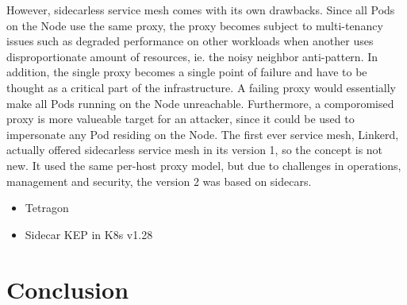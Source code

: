 \documentclass[english, 12pt, a4paper, sci, utf8, a-2b, online]{aaltothesis}
\begin{document}

However, sidecarless service mesh comes with its own drawbacks.
Since all Pods on the Node use the same proxy, the proxy becomes subject to multi-tenancy issues such as degraded performance on other workloads when another uses disproportionate amount of resources, ie. the noisy neighbor anti-pattern.
In addition, the single proxy becomes a single point of failure and have to be thought as a critical part of the infrastructure.
A failing proxy would essentially make all Pods running on the Node unreachable.
Furthermore, a comporomised proxy is more valueable target for an attacker, since it could be used to impersonate any Pod residing on the Node.
The first ever service mesh, Linkerd, actually offered sidecarless service mesh in its version 1, so the concept is not new.
It used the same per-host proxy model, but due to challenges in operations, management and security, the version 2 was based on sidecars.

\begin{itemize}
  \item Tetragon %
  \item Sidecar KEP in K8s v1.28 %
\end{itemize}


\clearpage

\section{Conclusion} \label{sec:conclusion}
\end{document}
